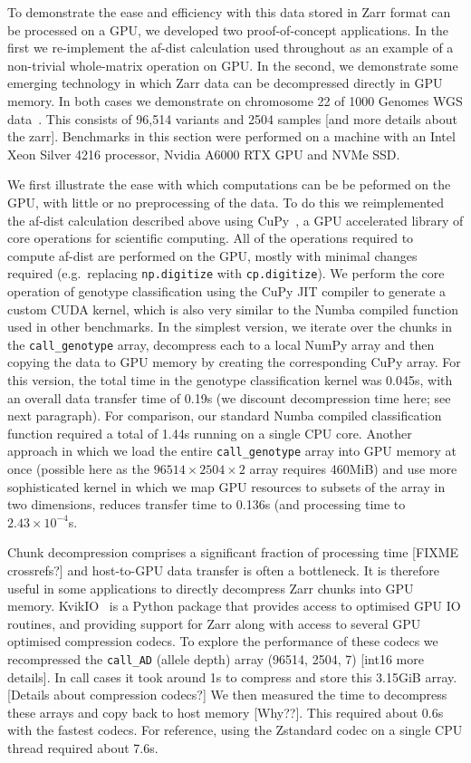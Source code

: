 \documentclass[a4paper,num-refs]{oup-contemporary}
\begin{document}
To demonstrate the ease and efficiency with this data stored in Zarr 
format can be processed on a GPU, we developed two proof-of-concept
applications. In the first we re-implement the af-dist calculation
used throughout as an example of a non-trivial whole-matrix operation
on GPU. In the second, we demonstrate some emerging technology 
in which Zarr data can be decompressed directly in GPU memory. 
In both cases we demonstrate on chromosome 22 of 
1000 Genomes WGS data~\citep{byrska2022high}. This consists
of 96,514 variants and 2504 samples [and more details about the zarr].
Benchmarks in this section were performed on a
machine with an Intel Xeon Silver 4216 processor,
Nvidia A6000 RTX GPU and NVMe SSD.

We first illustrate the ease with which computations can be 
be peformed on the GPU, with little or no preprocessing of the 
data. To do this we reimplemented the af-dist calculation
described above using CuPy~\citep{cupy}, a GPU accelerated library
of core operations for scientific computing.
All of the operations required to compute  af-dist are 
performed on the GPU, mostly with minimal changes required 
(e.g.\ replacing \texttt{np.digitize} with \texttt{cp.digitize}).
We perform the core operation of genotype classification using the
CuPy JIT compiler to generate a custom CUDA kernel, which 
is also very similar to the Numba compiled function used in other
benchmarks. In the simplest version, we iterate over the chunks
in the \texttt{call\_genotype} array, decompress each to a local
NumPy array and then copying the data to GPU memory by creating 
the corresponding CuPy array. For this version, the total time
in the genotype classification kernel was 0.045s, with an 
overall data transfer time of 0.19s (we discount decompression
time here; see next paragraph). For comparison, 
our standard Numba compiled classification function required 
a total of 1.44s running on a single CPU core.
Another approach in which we load the entire 
\texttt{call\_genotype} array into GPU memory at once (possible
here as the $96514 \times 2504 \times 2$ array requires 
460MiB) and use
more sophisticated kernel in which we map GPU resources to
subsets of the array in two dimensions, reduces transfer 
time to 0.136s (and processing time to $2.43\times10^{-4}$s.

Chunk decompression comprises a significant fraction of processing 
time [FIXME crossrefs?] and host-to-GPU data transfer is 
often a bottleneck. It is therefore useful in some applications 
to directly decompress Zarr chunks into GPU memory. 
KvikIO~\cite{kvikio} is a Python package that provides access to optimised
GPU IO routines, and providing support for Zarr along with
access to several GPU optimised compression codecs.
To explore the performance of these codecs we recompressed
the \texttt{call\_AD} (allele depth) array
(96514, 2504, 7) [int16 more details]. In call cases it took around 1s 
to compress and store this 3.15GiB array. [Details about compression codecs?]
We then measured the time to decompress these arrays and 
copy back to host memory [Why??]. This required about 0.6s with the 
fastest codecs. For reference, using the Zstandard codec on a single
CPU thread required about 7.6s.
\end{document}
